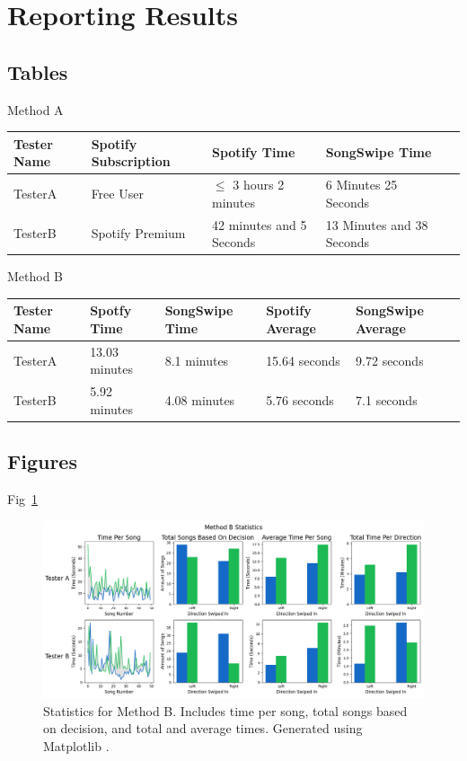 \documentclass{article}
\begin{document}
\section{Reporting Results}

\subsection*{Tables}
Method A
\begin{longtable}{lllll}
Tester Name & Spotify Subscription & Spotify Time & SongSwipe Time \\
\hline
TesterA & Free User & $\leq$ 3 hours 2 minutes & 6 Minutes 25 Seconds \\
TesterB & Spotify Premium & 42 minutes and 5 Seconds & 13 Minutes and 38 Seconds \\
\end{longtable}

Method B

\begin{longtable}{lllll}
    Tester Name & Spotfy Time & SongSwipe Time & Spotify Average & SongSwipe Average \\
    \hline
    TesterA & 13.03 minutes & 8.1 minutes & 15.64 seconds & 9.72 seconds \\
    TesterB & 5.92 minutes & 4.08 minutes & 5.76 seconds & 7.1 seconds \\
\end{longtable}

\subsection*{Figures}

Fig~\ref{fig:methodbstats}

\begin{figure}[ht]
    \centering
    \includegraphics[width=6in]{./method_b_statistics.png}
    \caption{Statistics for Method B. Includes time per song, total songs based on decision, and total and average times. Generated using Matplotlib \cite{Matplot}.}
    \label{fig:methodbstats}
  \end{figure}
\end{document}
